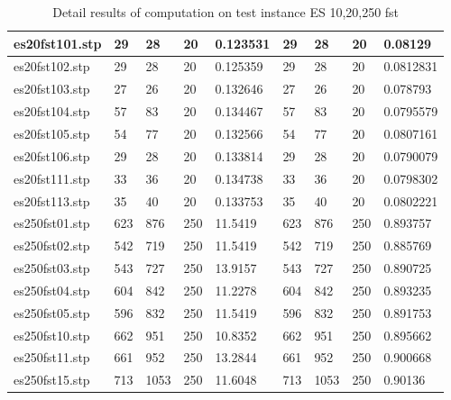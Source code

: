 \begin{table}[ht]
\begin{center}
\begin{tabular}{|l|l|l|l|l|l|l|l|l|}
     es20fst101.stp  & 29  &   28       &   20    &  0.123531     &  29       &   28       &   20    &    0.08129 \\ \hline
     es20fst102.stp  & 29  &   28       &   20    &  0.125359     &  29       &   28       &   20    &    0.0812831 \\ \hline
     es20fst103.stp  & 27  &   26       &   20    &  0.132646     &  27       &   26       &   20    &    0.078793 \\ \hline
     es20fst104.stp  & 57  &   83       &   20    &  0.134467     &  57       &   83       &   20    &    0.0795579 \\ \hline
     es20fst105.stp  & 54  &   77       &   20    &  0.132566     &  54       &   77       &   20    &    0.0807161 \\ \hline
     es20fst106.stp  & 29  &   28       &   20    &  0.133814     &  29       &   28       &   20    &    0.0790079 \\ \hline
     es20fst111.stp  & 33  &   36       &   20    &  0.134738     &  33       &   36       &   20    &    0.0798302 \\ \hline
     es20fst113.stp  & 35  &   40       &   20    &  0.133753     &  35       &   40       &   20    &    0.0802221 \\ \hline
     es250fst01.stp  & 623  &   876       &  250    & 11.5419     & 623       &   876      &  250    &    0.893757 \\ \hline
     es250fst02.stp  & 542  &   719       &  250    & 11.5419     & 542       &   719      &  250    &    0.885769 \\ \hline

     es250fst03.stp  & 543  &   727       &  250    & 13.9157     & 543       &   727      &  250    &    0.890725 \\ \hline
     es250fst04.stp  & 604  &   842       &  250    & 11.2278     & 604       &   842      &  250    &    0.893235 \\ \hline
     es250fst05.stp  & 596  &   832       &  250    & 11.5419     & 596       &   832      &  250    &    0.891753 \\ \hline
     es250fst10.stp  & 662  &   951       &  250    & 10.8352     & 662       &   951      &  250    &    0.895662 \\ \hline
     es250fst11.stp  & 661  &   952       &  250    & 13.2844     & 661       &   952      &  250    &    0.900668 \\ \hline
     es250fst15.stp  & 713  &   1053       &  250    & 11.6048     &713       &   1053      &  250    &   0.90136 \\ \hline


\end{tabular}
\end{center}
\caption{Detail results of computation on test instance ES 10,20,250 fst}
\end{table}


